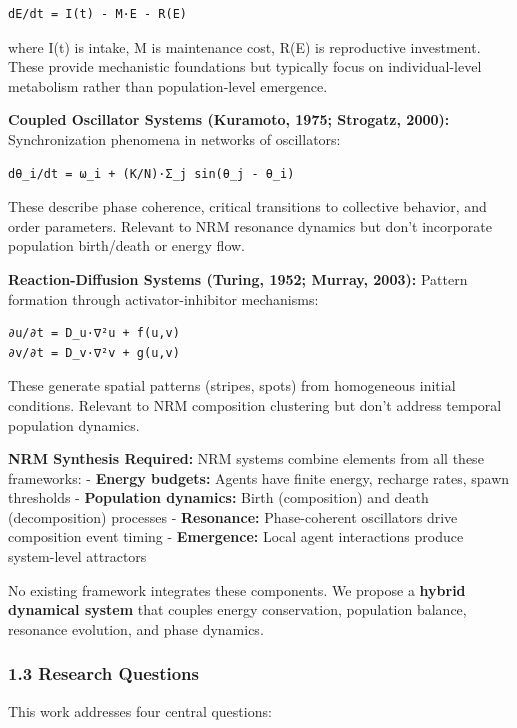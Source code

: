 \documentclass[
]{article}
\begin{document}
\begin{verbatim}
dE/dt = I(t) - M·E - R(E)
\end{verbatim}

where I(t) is intake, M is maintenance cost, R(E) is reproductive
investment. These provide mechanistic foundations but typically focus on
individual-level metabolism rather than population-level emergence.

\textbf{Coupled Oscillator Systems (Kuramoto, 1975; Strogatz, 2000):}
Synchronization phenomena in networks of oscillators:

\begin{verbatim}
dθ_i/dt = ω_i + (K/N)·Σ_j sin(θ_j - θ_i)
\end{verbatim}

These describe phase coherence, critical transitions to collective
behavior, and order parameters. Relevant to NRM resonance dynamics but
don't incorporate population birth/death or energy flow.

\textbf{Reaction-Diffusion Systems (Turing, 1952; Murray, 2003):}
Pattern formation through activator-inhibitor mechanisms:

\begin{verbatim}
∂u/∂t = D_u·∇²u + f(u,v)
∂v/∂t = D_v·∇²v + g(u,v)
\end{verbatim}

These generate spatial patterns (stripes, spots) from homogeneous
initial conditions. Relevant to NRM composition clustering but don't
address temporal population dynamics.

\textbf{NRM Synthesis Required:} NRM systems combine elements from all
these frameworks: - \textbf{Energy budgets:} Agents have finite energy,
recharge rates, spawn thresholds - \textbf{Population dynamics:} Birth
(composition) and death (decomposition) processes - \textbf{Resonance:}
Phase-coherent oscillators drive composition event timing -
\textbf{Emergence:} Local agent interactions produce system-level
attractors

No existing framework integrates these components. We propose a
\textbf{hybrid dynamical system} that couples energy conservation,
population balance, resonance evolution, and phase dynamics.

\subsubsection{1.3 Research Questions}\label{research-questions}

This work addresses four central questions:
\end{document}
